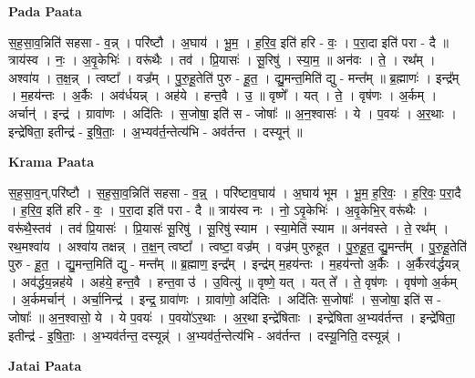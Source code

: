 \documentclass[17pt]{extarticle}
\begin{document}
\textbf{Pada Paata} \newline

स॒ह॒सा॒व॒न्निति॑ सहसा - व॒न्न् । परि॑ष्टौ । अ॒घाय॑ । भू॒म॒ । ह॒रि॒व॒ इति॑ हरि - वः॒ । प॒रा॒दा इति॑ परा - दै ॥ त्राय॑स्व । नः॒ । अ॒वृ॒केभिः॑ । वरू॑थैः । तव॑ । प्रि॒यासः॑ । सू॒रिषु॑ । स्या॒म॒ ॥ अन॑वः । ते॒ । रथ᳚म् । अश्वा॑य । त॒क्ष॒न्न् । त्वष्टा᳚ । वज्र᳚म् । पु॒रु॒हू॒तेति॑ पुरु - हू॒त॒ । द्यु॒मन्त॒मिति॑ द्यु - मन्त᳚म् ॥ ब्र॒ह्माणः॑ । इन्द्र᳚म् । म॒हय॑न्तः । अ॒र्कैः । अव॑र्धयन्न् । अह॑ये । हन्त॒वै । उ॒ ॥ वृष्णे᳚ । यत् । ते॒ । वृष॑णः । अ॒र्कम् । अर्चान्॑ । इन्द्र॑ । ग्रावा॑णः । अदि॑तिः । स॒जोषा॒ इति॑ स - जोषाः᳚ ॥ अ॒न॒श्वासः॑ । ये । प॒वयः॑ । अ॒र॒थाः । इन्द्रे॑षिता॒ इतीन्द्र॑ - इ॒षि॒ताः॒ । अ॒भ्यव॑र्त॒न्तेत्य॑भि - अव॑र्तन्त । दस्यून्॑ ॥  \newline


\textbf{Krama Paata} \newline

स॒ह॒सा॒व॒न्,परि॑ष्टौ । स॒ह॒सा॒व॒न्निति॑ सहसा - व॒न्न्॒ । परि॑ष्टाव॒घाय॑ । अ॒घाय॑ भूम । भू॒म॒ ह॒रि॒वः॒ । ह॒रि॒वः॒ प॒रा॒दै । ह॒रि॒व॒ इति॑ हरि - वः॒ । प॒रा॒दा इति॑ परा - दै ॥ त्राय॑स्व नः । नो॒ ऽवृ॒केभिः॑ । अ॒वृ॒केभि॒र् वरू॑थैः । वरू॑थै॒स्तव॑ । तव॑ प्रि॒यासः॑ । प्रि॒यासः॑ सू॒रिषु॑ । सू॒रिषु॑ स्याम । स्या॒मेति॑ स्याम ॥ अन॑वस्ते । ते॒ रथ᳚म् । रथ॒मश्वा॑य । अश्वा॑य तक्षन्न् । त॒क्ष॒न् त्वष्टा᳚ । त्वष्टा॒ वज्र᳚म् । वज्र॑म् पुरुहूत । पु॒रु॒हू॒त॒ द्यु॒मन्त᳚म् । पु॒रु॒हू॒तेति॑ पुरु - हू॒त॒ । द्यु॒मन्त॒मिति॑ द्यु - मन्त᳚म् ॥ ब्र॒ह्माण॒ इन्द्र᳚म् । इन्द्र॑म् म॒हय॑न्तः । म॒हय॑न्तो अ॒र्कैः । अ॒र्कैरव॑र्द्धयन्न् । अव॑र्द्धय॒न्नह॑ये । अह॑ये॒ हन्त॒वै । हन्त॒वा उ॑ । उ॒वित्यु॑ ॥ वृष्णे॒ यत् । यत् ते᳚ । ते॒ वृष॑णः । वृष॑णो अ॒र्कम् । अ॒र्कमर्चान्॑ । अर्चा॒निन्द्र॑ । इन्द्र॒ ग्रावा॑णः । ग्रावा॑णो॒ अदि॑तिः । अदि॑तिः स॒जोषाः᳚ । स॒जोषा॒ इति॑ स - जोषाः᳚ ॥ अ॒न॒श्वासो॒ ये । ये प॒वयः॑ । प॒वयो॑ऽर॒थाः । अ॒र॒था इन्द्रे॑षिताः । इन्द्रे॑षिता अ॒भ्यव॑र्तन्त । इन्द्रे॑षिता॒ इतीन्द्र॑ - इ॒षि॒ताः॒ । अ॒भ्यव॑र्तन्त॒ दस्यून्न्॑ । अ॒भ्यव॑र्त॒न्तेत्य॑भि - अव॑र्तन्त । दस्यू॒निति॒ दस्यून्न्॑ । \newline

\textbf{Jatai Paata} \newline
\end{document}

